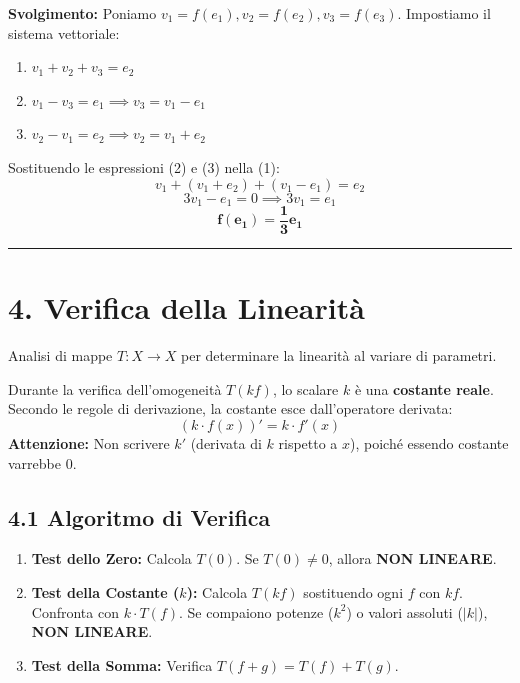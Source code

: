\documentclass[10pt,a4paper]{article}
\begin{document}
\textbf{Svolgimento:}
Poniamo $v_1=f(e_1), v_2=f(e_2), v_3=f(e_3)$. Impostiamo il sistema vettoriale:
\begin{enumerate}
    \item $v_1 + v_2 + v_3 = e_2$
    \item $v_1 - v_3 = e_1 \implies v_3 = v_1 - e_1$
    \item $v_2 - v_1 = e_2 \implies v_2 = v_1 + e_2$
\end{enumerate}

Sostituendo le espressioni (2) e (3) nella (1):
\[ v_1 + (v_1 + e_2) + (v_1 - e_1) = e_2 \]
\[ 3v_1 - e_1 = 0 \implies 3v_1 = e_1 \]
\[ \mathbf{f(e_1) = \frac{1}{3}e_1} \]

\vspace{0.5cm}
\hrule
\vspace{0.5cm}

\section*{4. Verifica della Linearità}
Analisi di mappe $T: X \to X$ per determinare la linearità al variare di parametri.

\begin{tcolorbox}[colback=blue!5!white,colframe=blue!75!black,title=Nota Fondamentale sul Calcolo]
Durante la verifica dell'omogeneità $T(kf)$, lo scalare $k$ è una \textbf{costante reale}. 
Secondo le regole di derivazione, la costante esce dall'operatore derivata:
\[ (k \cdot f(x))' = k \cdot f'(x) \]
\textbf{Attenzione:} Non scrivere $k'$ (derivata di $k$ rispetto a $x$), poiché essendo costante varrebbe 0.
\end{tcolorbox}

\subsection*{4.1 Algoritmo di Verifica}
\begin{enumerate}
    \item \textbf{Test dello Zero:} Calcola $T(0)$. Se $T(0) \neq 0$, allora \textbf{NON LINEARE}.
    \item \textbf{Test della Costante ($k$):} Calcola $T(kf)$ sostituendo ogni $f$ con $kf$. Confronta con $k \cdot T(f)$. Se compaiono potenze ($k^2$) o valori assoluti ($|k|$), \textbf{NON LINEARE}.
    \item \textbf{Test della Somma:} Verifica $T(f+g) = T(f) + T(g)$.
\end{enumerate}
\end{document}
